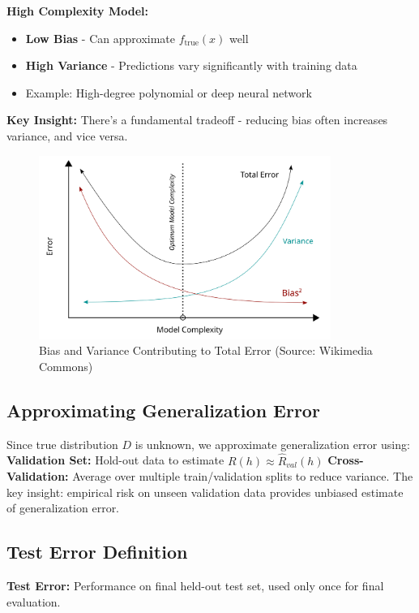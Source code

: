 \documentclass{article}
\begin{document}
\textbf{High Complexity Model:}
\begin{itemize}
    \item \textbf{Low Bias} - Can approximate $f_{\text{true}}(x)$ well
    \item \textbf{High Variance} - Predictions vary significantly with training data
    \item Example: High-degree polynomial or deep neural network
\end{itemize}

\textbf{Key Insight:} There's a fundamental tradeoff - reducing bias often increases variance, and vice versa.

\begin{figure}[h]
\centering
\includegraphics[width=0.85\textwidth]{bias-variance-diagram.png}
\caption{Bias and Variance Contributing to Total Error (Source: Wikimedia Commons)}
\end{figure}

\subsection{Approximating Generalization Error}
Since true distribution $D$ is unknown, we approximate generalization error using:
\textbf{Validation Set:} Hold-out data to estimate $R(h) \approx \hat{R}_{val}(h)$
\textbf{Cross-Validation:} Average over multiple train/validation splits to reduce variance.
The key insight: empirical risk on unseen validation data provides unbiased estimate of generalization error.

\subsection{Test Error Definition}
\textbf{Test Error:} Performance on final held-out test set, used only once for final evaluation.
\end{document}
